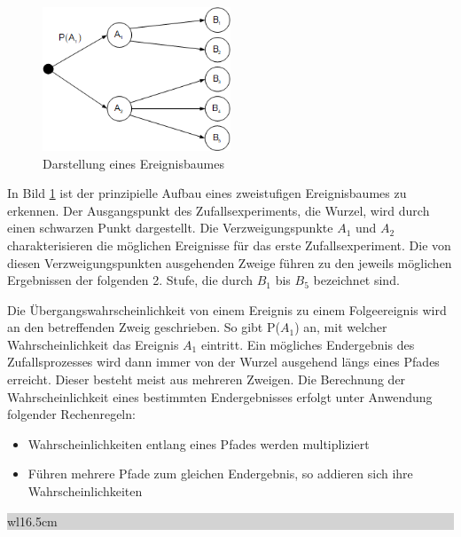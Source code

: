 \noindent 
\begin{figure}[H]
  \centerline{\includegraphics[width=0.5\textwidth]{Kapitel2/Bilder/image7}}
  \caption{Darstellung eines Ereignisbaumes}
  \label{fig:DarstellungEreignisbaum}
\end{figure}

\noindent In Bild \ref{fig:DarstellungEreignisbaum} ist der prinzipielle Aufbau eines zweistufigen Ereignisbaumes zu erkennen. Der Ausgangspunkt des Zufallsexperiments, die Wurzel, wird durch einen schwarzen Punkt dargestellt. Die Verzweigungspunkte $A_{1}$ und $A_{2}$ charakterisieren die m\"{o}glichen Ereignisse f\"{u}r das erste Zufallsexperiment. Die von diesen Verzweigungspunkten ausgehenden Zweige f\"{u}hren zu den jeweils m\"{o}glichen Ergebnissen der folgenden 2. Stufe, die durch $B_{1}$ bis $B_{5}$ bezeichnet sind.\newline

\noindent Die \"{U}bergangswahrscheinlichkeit von einem Ereignis zu einem Folgeereignis wird an den betreffenden Zweig geschrieben. So gibt P($A_{1}$) an, mit welcher Wahrscheinlichkeit das Ereignis $A_{1}$ eintritt. Ein m\"{o}gliches Endergebnis des Zufallsprozesses wird dann immer von der Wurzel ausgehend l\"{a}ngs eines Pfades erreicht. Dieser besteht meist aus mehreren Zweigen. Die Berechnung der Wahrscheinlichkeit eines bestimmten Endergebnisses erfolgt unter Anwendung folgender Rechenregeln:

\begin{itemize}
    \item Wahrscheinlichkeiten entlang eines Pfades werden multipliziert
    \item Führen mehrere Pfade zum gleichen Endergebnis, so addieren sich ihre Wahrscheinlichkeiten
\end{itemize}

\noindent
\colorbox{lightgray}{%
%
\renewcommand\arraystretch{0.6}%
\begin{tabular}{ wl{16.5cm} }
{\selectfont
{}}
\end{tabular}%
}\bigskip

